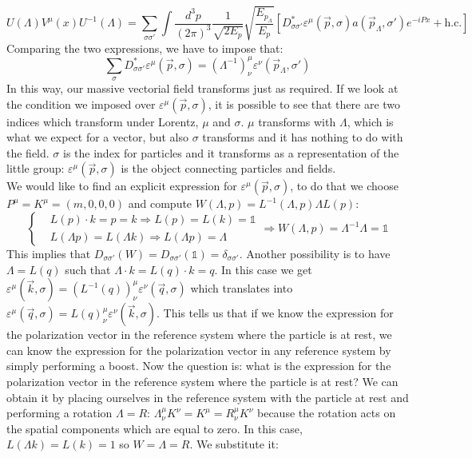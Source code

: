 \documentclass[../main.tex]{subfiles}
\begin{document}
\[
U(\Lambda)V^\mu(x)U^{-1}(\Lambda)=\sum_{\sigma\sigma'}\int\frac{d^3p}{(2\pi)^3}\frac{1}{\sqrt{2E_p}}\sqrt{\frac{E_{p_\Lambda}}{E_p}}\left[D_{\sigma\sigma'}^*\varepsilon^\mu(\vec{p},\sigma)a(\vec{p}_\Lambda,\sigma')e^{-iPx}+\text{h.c.}\right]
\]
Comparing the two expressions, we have to impose that:
\[
\sum_\sigma D_{\sigma\sigma'}^*\varepsilon^\mu(\vec{p},\sigma)=(\Lambda^{-1})^\mu_\nu\varepsilon^\nu(\vec{p}_\Lambda,\sigma')
\]
In this way, our massive vectorial field transforms just as required.
If we look at the condition we imposed over $\varepsilon^\mu(\vec{p},\sigma)$, it is possible to see that there are two indices which transform under Lorentz, $\mu$ and $\sigma$. $\mu$ transforms with $\Lambda$, which is what we expect for a vector, but also $\sigma$ transforms and it has nothing to do with the field. $\sigma$ is the index for particles and it transforms as a representation of the little group: $\varepsilon^\mu(\vec{p},\sigma)$ is the object connecting particles and fields.\\
We would like to find an explicit expression for $\varepsilon^\mu(\vec{p},\sigma)$, to do that we choose $P^\mu=K^\mu=(m,0,0,0)$ and compute $W(\Lambda,p)=L^{-1}(\Lambda,p)\Lambda L(p)$:
\[
\left\{
\begin{aligned}
&L(p)\cdot k=p=k\Rightarrow L(p)=L(k)=\mathbb{1}\\
&L(\Lambda p)=L(\Lambda k)\Rightarrow L(\Lambda p)=\Lambda
\end{aligned}
\right.
\Rightarrow W(\Lambda,p)=\Lambda^{-1}\Lambda=\mathbb{1}
\]
This implies that $D_{\sigma\sigma'}(W)=D_{\sigma\sigma'}(\mathbb{1})=\delta_{\sigma\sigma'}$. Another possibility is to have $\Lambda=L(q)$ such that $\Lambda\cdot k=L(q)\cdot k=q$. In this case we get\\
$\varepsilon^\mu(\vec{k},\sigma)=(L^{-1}(q))^\mu_\nu\varepsilon^\nu(\vec{q},\sigma)$ which translates into $\varepsilon^\mu(\vec{q},\sigma)=L(q)^\mu_\nu\varepsilon^\nu(\vec{k},\sigma)$. This tells us that if we know the expression for the polarization vector in the reference system where the particle is at rest, we can know the expression for the polarization vector in any reference system by simply performing a boost. Now the question is: what is the expression for the polarization vector in the reference system where the particle is at rest? We can obtain it by placing ourselves in the reference system with the particle at rest and performing a rotation $\Lambda=R$: $\Lambda^\mu_\nu K^\nu=K^\mu=R^\mu_\nu K^\nu$ because the rotation acts on the spatial components which are equal to zero. In this case, $L(\Lambda k)=L(k)=1$ so $W=\Lambda=R$. We substitute it:
\end{document}
